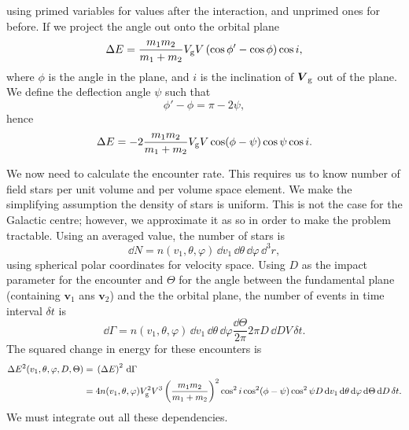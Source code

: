 using primed variables for values after the interaction, and unprimed ones for before. If we project the angle out onto the orbital plane
\begin{equation}
\Delta E = \frac{m_1 m_2}{m_1 + m_2}V_\mathrm{g}V\left(\cos\phi' - \cos\phi\right)\cos i,
\end{equation}
where $\phi$ is the angle in the plane, and $i$ is the inclination of $\boldsymbol{V}_\mathrm{g}$ out of the plane. We define the deflection angle $\psi$ such that
\begin{equation}
\phi' - \phi = \pi - 2\psi,
\end{equation}
hence
\begin{equation}
\Delta E = -2\frac{m_1 m_2}{m_1 + m_2}V_\mathrm{g}V\cos(\phi - \psi)\cos\psi\cos i.
\end{equation}

We now need to calculate the encounter rate. This requires us to know number of field stars per unit volume and per volume space element. We make the simplifying assumption the density of stars is uniform. This is not the case for the Galactic centre; however, we approximate it as so in order to make the problem tractable. Using an averaged value, the number of stars is
\begin{equation}
\dd N = n(v_1, \theta, \varphi)\,\dd v_1 \,\dd \theta \,\dd \varphi \,\dd^3r,
\end{equation}
using spherical polar coordinates for velocity space. Using $D$ as the impact parameter for the encounter and $\Theta$ for the angle between the fundamental plane (containing $\boldsymbol{v}_1$ ans $\boldsymbol{v}_2$) and the the orbital plane, the number of events in time interval $\delta t$ is
\begin{equation}
\dd \Gamma =  n(v_1, \theta, \varphi)\,\dd v_1 \,\dd \theta \,\dd \varphi \frac{\dd \Theta}{2\pi} 2\pi D \,\dd D V \,\delta t.
\end{equation}
The squared change in energy for these encounters is
\begin{align}
\Delta E^2(v_1,\theta,\varphi,D,\Theta) = {} & \left(\Delta E\right)^2\,\mathrm{d} \Gamma\\
 = {} & 4 n(v_1,\theta,\varphi)V_\mathrm{g}^2V^3\left(\frac{m_1m_2}{m_1+m_2}\right)^2\cos^2i\cos^2(\phi-\psi)\cos^2\psi D\,\mathrm{d} v_1\,\mathrm{d}\theta\,\mathrm{d}\varphi\,\mathrm{d}\Theta\,\mathrm{d} D\,\delta t.
\end{align}
We must integrate out all these dependencies.

